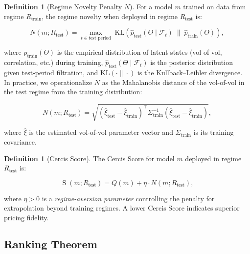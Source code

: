 \documentclass[11pt,a4paper]{article}
\theoremstyle{plain}
\theoremstyle{definition}
\newtheorem{definition}[theorem]{Definition}
\theoremstyle{remark}
\newcommand{\F}{\mathcal{F}}
\DeclareMathOperator{\CercisScore}{S}
\begin{document}
\begin{definition}[Regime Novelty Penalty $N$]\label{def:N}
For a model $m$ trained on data from regime $R_{\text{train}}$, the regime novelty when deployed in regime $R_{\text{test}}$ is:

\begin{equation}\label{eq:N_def}
  N(m; R_{\text{test}}) = \max_{t \in \text{test period}} \; \text{KL}\!\left(\hat{p}_{\text{test}}(\Theta \mid \F_t) \;\big\|\; \hat{p}_{\text{train}}(\Theta)\right),
\end{equation}

where $\hat{p}_{\text{train}}(\Theta)$ is the empirical distribution of latent states (vol-of-vol, correlation, etc.) during training, $\hat{p}_{\text{test}}(\Theta \mid \F_t)$ is the posterior distribution given test-period filtration, and $\text{KL}(\cdot\|\cdot)$ is the Kullback--Leibler divergence. In practice, we operationalize $N$ as the Mahalanobis distance of the vol-of-vol in the test regime from the training distribution:

\begin{equation}\label{eq:N_mahalanobis}
  N(m; R_{\text{test}}) = \sqrt{(\hat{\xi}_{\text{test}} - \hat{\xi}_{\text{train}})^\top \Sigma_{\text{train}}^{-1} (\hat{\xi}_{\text{test}} - \hat{\xi}_{\text{train}})},
\end{equation}

where $\hat{\xi}$ is the estimated vol-of-vol parameter vector and $\Sigma_{\text{train}}$ is its training covariance.
\end{definition}

\begin{definition}[Cercis Score]\label{def:cercis}
The Cercis Score for model $m$ deployed in regime $R_{\text{test}}$ is:

\begin{equation}\label{eq:S_def}
  \CercisScore(m; R_{\text{test}}) = Q(m) + \eta \cdot N(m; R_{\text{test}}),
\end{equation}

where $\eta > 0$ is a \emph{regime-aversion parameter} controlling the penalty for extrapolation beyond training regimes. A lower Cercis Score indicates superior pricing fidelity.
\end{definition}

\subsection{Ranking Theorem}
\end{document}
